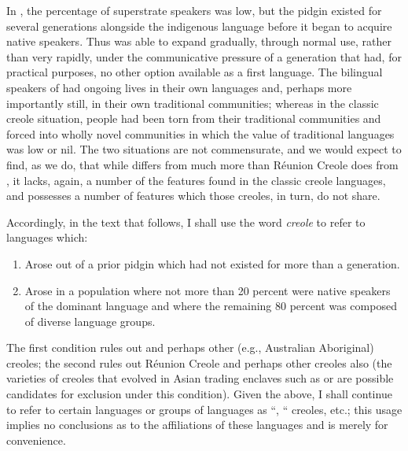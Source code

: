 In , the percentage of superstrate speakers was low, but the pidgin existed for several generations alongside the indigenous language before it began to acquire native speakers. Thus  was able to expand gradually, through normal use, rather than very rapidly, under the communicative pressure of a generation that had, for practical purposes, no other option available as a first language. The bilingual speakers of  had ongoing lives in their own languages and, perhaps more importantly still, in their own traditional communities; whereas in the classic creole situation, people had been torn from their traditional communities and forced into wholly novel communities in which the value of traditional languages was low or nil. The two situations are not commensurate, and we would expect
to find, as we do, that while  differs from  much more than Réunion Creole does from , it lacks, again, a number of the features found in the classic creole languages, and possesses a number of features which those creoles, in turn, do not share.

Accordingly, in the text that follows, I shall use the word \textit{creole}
to refer to languages which:

\begin{enumerate}
\item Arose out of a prior pidgin which had not existed for more than a generation.
\item Arose in a population where not more than 20 percent were native speakers of the dominant language and where the remaining 80 percent was composed of diverse language groups.
\end{enumerate}



The first condition rules out  and perhaps other (e.g., Austra\-lian Aboriginal) creoles; the second rules out Réunion Creole and perhaps other creoles also (the varieties of  creoles that evolved in Asian trading enclaves such as  or  are possible candidates for exclusion under this condition). Given the above, I shall continue to refer to certain languages or groups of languages as ``,{\textquotedbl} `` creoles, etc.; this usage implies no conclusions as to the affiliations of these languages and is merely for convenience.

